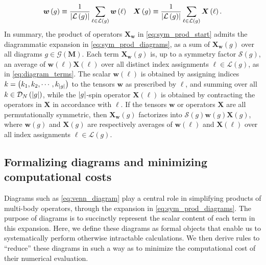 \documentclass[nofootinbib,notitlepage,11pt]{revtex4-2}
\newcommand{\f}[2]{\dfrac{#1}{#2}} %
\newcommand{\p}[1]{\left(#1\right)} %
\newcommand{\m}{\bm} %
\newcommand{\1}{\mathds{1}}
\newcommand{\D}{\mathcal{D}}
\newcommand{\G}{\mathcal{G}}
\renewcommand{\L}{\mathcal{L}}
\renewcommand{\S}{\mathcal{S}}
\begin{document}
\begin{align}
  \m w\p{g} \equiv \f1{\abs{\L\p{g}}}
  \sum_{\ell\in\L\p{g}} \m w\p{\ell}
  &&
  \m X\p{g} \equiv \f1{\abs{\L\p{g}}}
  \sum_{\ell\in\L\p{g}} \m X\p{\ell}.
  \label{eq:diagram_factors}
\end{align}
In summary, the product of operators $\m X_{\m w}$ in
\eqref{eq:sym_prod_start} admits the diagrammatic expansion in
\eqref{eq:sym_prod_diagrams}, as a sum of $\m X_{\m w}\p{g}$ over all
diagrams $g\in\G\p{\m M}$.  Each term $\m X_{\m w}\p{g}$ is, up to a
symmetry factor $\S\p{g}$, an average of $\m w\p{\ell} \m X\p{\ell}$
over all distinct index assignments $\ell\in\L\p{g}$, as in
\eqref{eq:diagram_terms}.  The scalar $\m w\p{\ell}$ is obtained by
assigning indices $k=\p{k_1,k_2,\cdots,k_{\abs{g}}}$ to the tensors
$\m w$ as prescribed by $\ell$, and summing over all
$k\in\D_N\p{\abs{g}}$, while the $\abs{g}$-spin operator
$\m X\p{\ell}$ is obtained by contracting the operators in $\m X$ in
accordance with $\ell$.  If the tensors $\m w$ or operators $\m X$ are
all permutationally symmetric, then $\m X_{\m w}\p{g}$ factorizes into
$\S\p{g} \m w\p{g} \m X\p{g}$, where $\m w\p{g}$ and $\m X\p{g}$ are
respectively averages of $\m w\p{\ell}$ and $\m X\p{\ell}$ over all
index assignments $\ell\in\L\p{g}$.

\subsection{Formalizing diagrams and minimizing computational costs}
\label{sec:diagrams}

Diagrams such as \eqref{eq:venn_diagram} play a central role in
simplifying products of multi-body operators, through the expansion in
\eqref{eq:sym_prod_diagrams}.  The purpose of diagrams is to
succinctly represent the scalar content of each term in this
expansion.  Here, we define these diagrams as formal objects that
enable us to systematically perform otherwise intractable
calculations.  We then derive rules to ``reduce'' these diagrams in
such a way as to minimize the computational cost of their numerical
evaluation.
\end{document}
